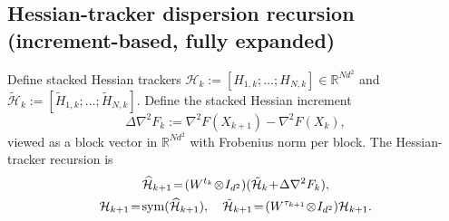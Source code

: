 \documentclass[11pt,a4paper]{article}
\newcommand{\R}{\mathbb{R}}
\begin{document}
\subsection{Hessian-tracker dispersion recursion (increment-based, fully expanded)}

Define stacked Hessian trackers $\mathcal H_k:=[H_{1,k};\dots;H_{N,k}]\in\R^{Nd^2}$ and
$\tilde{\mathcal H}_k:=[\tilde H_{1,k};\dots;\tilde H_{N,k}]$.
Define the stacked Hessian increment
\[
\Delta\nabla^2 F_k:=\nabla^2 F(X_{k+1})-\nabla^2 F(X_k),
\]
viewed as a block vector in $\R^{Nd^2}$ with Frobenius norm per block.
The Hessian-tracker recursion is
\begin{gather}
\widehat{\mathcal H}_{k+1}\!=\!(W^{t_k}\!\otimes\! I_{d^2})(\tilde{\mathcal H}_k\!+\!\Delta\nabla^2 F_k),\label{eq:H_update_stack}\\
\mathcal H_{k+1}\!=\!\mathrm{sym}(\widehat{\mathcal H}_{k+1}),\quad
\tilde{\mathcal H}_{k+1}\!=\!(W^{\tau_{k+1}}\!\otimes\! I_{d^2})\mathcal H_{k+1}.\notag
\end{gather}
\end{document}
